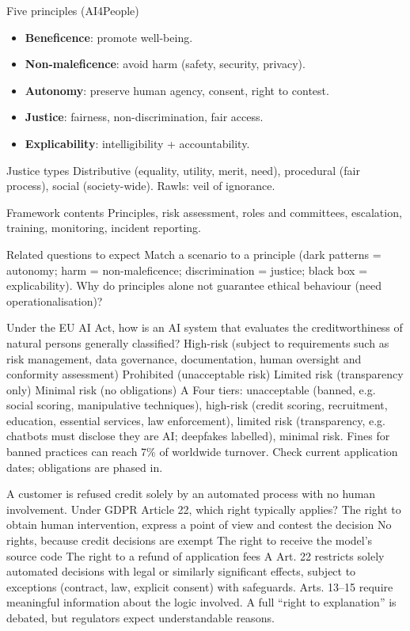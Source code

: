 {\begin{block}{Five principles (AI4People)}
		\begin{itemize}
			\item \textbf{Beneficence}: promote well-being.
			\item \textbf{Non-maleficence}: avoid harm (safety, security, privacy).
			\item \textbf{Autonomy}: preserve human agency, consent, right to contest.
			\item \textbf{Justice}: fairness, non-discrimination, fair access.
			\item \textbf{Explicability}: intelligibility + accountability.
\end{itemize}\end{block}}
{\begin{block}{Justice types}
		Distributive (equality, utility, merit, need), procedural (fair process), social (society-wide). Rawls: veil of ignorance.
	\end{block}
	\begin{block}{Framework contents}
		Principles, risk assessment, roles and committees, escalation, training, monitoring, incident reporting.
	\end{block}
	\begin{alertblock}{Related questions to expect}
		Match a scenario to a principle (dark patterns = autonomy; harm = non-maleficence; discrimination = justice; black box = explicability). Why do principles alone not guarantee ethical behaviour (need operationalisation)?
\end{alertblock}}

{Under the EU AI Act, how is an AI system that evaluates the creditworthiness of natural persons generally classified?}
{High-risk (subject to requirements such as risk management, data governance, documentation, human oversight and conformity assessment)}
{Prohibited (unacceptable risk)}
{Limited risk (transparency only)}
{Minimal risk (no obligations)}
{A}
{Four tiers: unacceptable (banned, e.g. social scoring, manipulative techniques), high-risk (credit scoring, recruitment, education, essential services, law enforcement), limited risk (transparency, e.g. chatbots must disclose they are AI; deepfakes labelled), minimal risk. Fines for banned practices can reach 7\% of worldwide turnover. Check current application dates; obligations are phased in.}

{A customer is refused credit solely by an automated process with no human involvement. Under GDPR Article 22, which right typically applies?}
{The right to obtain human intervention, express a point of view and contest the decision}
{No rights, because credit decisions are exempt}
{The right to receive the model's source code}
{The right to a refund of application fees}
{A}
{Art. 22 restricts solely automated decisions with legal or similarly significant effects, subject to exceptions (contract, law, explicit consent) with safeguards. Arts. 13--15 require meaningful information about the logic involved. A full ``right to explanation'' is debated, but regulators expect understandable reasons.}

